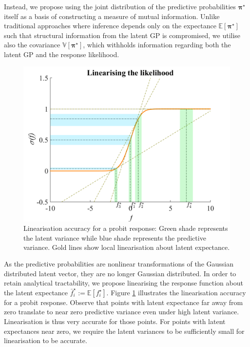 \documentclass{article}
\renewcommand{\vec}[1]{\boldsymbol{#1}}
\begin{document}
		Instead, we propose using the joint distribution of the predictive probabilities $\vec{\pi^{\star}}$ itself as a basis of constructing a measure of mutual information. Unlike traditional approaches where inference depends only on the expectance $\mathbb{E}[\vec{\pi^{\star}}]$ such that structural information from the latent GP is compromised, we utilise also the covariance $\mathbb{V}[\vec{\pi^{\star}}]$, which withholds information regarding both the latent GP and the response likelihood.
	
		\begin{figure}[!htbp]
			\centering
				\includegraphics[width = \linewidth]{Figures/linearisation.png}
			\caption{Linearisation accuracy for a probit response: Green shade represents the latent variance while blue shade represents the predictive variance. Gold lines show local linearisation about latent expectance.}
			\label{Figure:Linearisation}
		\end{figure}
			
		As the predictive probabilities are nonlinear transformations of the Gaussian distributed latent vector, they are no longer Gaussian distributed. In order to retain analytical tractability, we propose linearising the response function about the latent expectance $\bar{f}^{\star}_{i} := \mathbb{E}[f^{\star}_{i}]$. Figure \ref{Figure:Linearisation} illustrates the linearisation accuracy for a probit response. Observe that points with latent expectance far away from zero translate to near zero predictive variance even under high latent variance. Linearisation is thus very accurate for those points. For points with latent expectances near zero, we require the latent variances to be sufficiently small for linearisation to be accurate.
		
\end{document}
